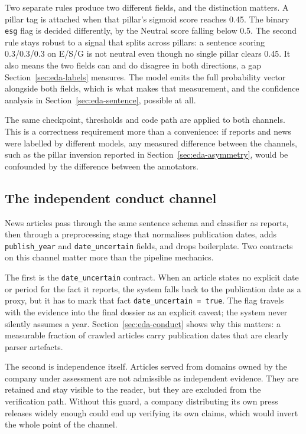 \documentclass[fontsize=12pt,oneside,headings=small]{scrreprt}
\begin{document}
Two separate rules produce two different fields, and the distinction
matters. A pillar tag is attached when that pillar's sigmoid score reaches
0.45. The binary \texttt{esg} flag is decided differently, by the Neutral
score falling below 0.5. The second rule stays robust to a signal that splits
across pillars: a sentence scoring 0.3/0.3/0.3 on E/S/G is not neutral
even though no single pillar clears 0.45. It also means the two fields can
and do disagree in both directions, a gap Section~\ref{sec:eda-labels} measures.
The model emits the full probability vector alongside both fields, which is
what makes that measurement, and the confidence analysis in
Section~\ref{sec:eda-sentence}, possible at all.

The same checkpoint, thresholds and code path are applied to both channels.
This is a correctness requirement more than a convenience: if reports and news
were labelled by different models, any measured difference between the
channels, such as the pillar inversion reported in
Section~\ref{sec:eda-asymmetry}, would be confounded by the difference between
the annotators.
\subsection{The independent conduct channel}
\label{sec:conduct-channel}

News articles pass through the same sentence schema and classifier as
reports, then through a preprocessing stage that normalises publication dates, adds
\texttt{publish\_year} and \texttt{date\_uncertain} fields, and drops
boilerplate. Two contracts on this channel matter more than the pipeline
mechanics.

The first is the \texttt{date\_uncertain} contract. When an article states no
explicit date or period for the fact it reports, the system falls back to
the publication date as a proxy, but it has to mark that fact
\texttt{date\_uncertain = true}. The flag travels with the evidence into the
final dossier as an explicit caveat; the system never silently assumes a
year. Section~\ref{sec:eda-conduct} shows why this matters: a measurable
fraction of crawled articles carry publication dates that are clearly parser
artefacts.

The second is independence itself. Articles served from domains owned by the company
under assessment are not admissible as independent evidence. They are
retained and stay visible to the reader, but they are excluded from the
verification path. Without this guard, a company distributing its own press
releases widely enough could end up verifying its own claims, which would
invert the whole point of the channel.
\end{document}
